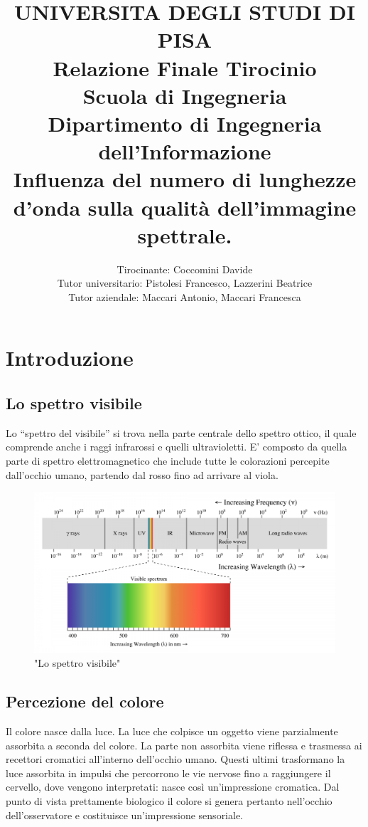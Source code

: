 \documentclass[a4paper,11pt]{article}
\author{
        Tirocinante: Coccomini Davide \\
        Tutor universitario: Pistolesi Francesco, Lazzerini Beatrice \\
        Tutor aziendale: Maccari Antonio, Maccari Francesca
    }
\title{\textbf{UNIVERSITA DEGLI STUDI DI PISA} \\[0.4in]
        Relazione Finale Tirocinio \\
    Scuola di Ingegneria \\
    Dipartimento di Ingegneria dell’Informazione \\[1in]
    Influenza del numero di lunghezze d’onda sulla qualità dell’immagine spettrale.}
\date{}
\begin{document}
    \maketitle  
    \newpage
        \tableofcontents
        \newpage
        \section{Introduzione}
        \subsection{Lo spettro visibile}
        Lo “spettro del visibile” si trova nella parte centrale dello spettro ottico, il quale
        comprende anche i raggi infrarossi e quelli ultravioletti. E’ composto da quella parte di
        spettro elettromagnetico che include tutte le colorazioni percepite dall’occhio umano,
        partendo dal rosso fino ad arrivare al viola.
        \begin{figure}[h]
            \centering
            \includegraphics[scale=0.3]{colorimetria3}
            \caption{"Lo spettro visibile"}
        \end{figure}
        \newpage
        \subsection{Percezione del colore}
        Il colore nasce dalla luce. La luce che colpisce un oggetto viene parzialmente assorbita a
        seconda del colore. La parte non assorbita viene riflessa e trasmessa ai recettori cromatici
        all’interno dell’occhio umano. Questi ultimi trasformano la luce assorbita in impulsi che
        percorrono le vie nervose fino a raggiungere il cervello, dove vengono interpretati: nasce così
        un’impressione cromatica. Dal punto di vista prettamente biologico il colore si genera pertanto
        nell’occhio dell’osservatore e costituisce un’impressione sensoriale.
\end{document}
